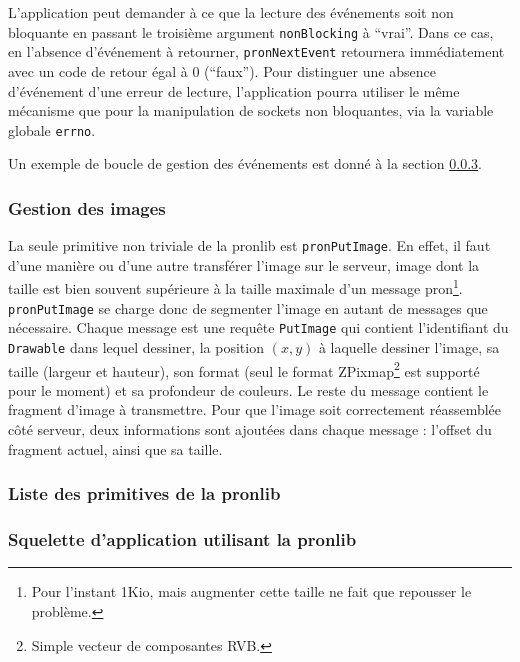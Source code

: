L'application peut demander à ce que la lecture des événements soit non bloquante en passant le troisième argument \verb|nonBlocking| à ``vrai''. Dans ce cas, en l'absence d'événement à retourner, \verb|pronNextEvent| retournera immédiatement avec un code de retour égal à 0 (``faux''). Pour distinguer une absence d'événement d'une erreur de lecture, l'application pourra utiliser le même mécanisme que pour la manipulation de sockets non bloquantes, via la variable globale \verb|errno|.

Un exemple de boucle de gestion des événements est donné à la section \ref{Squelette}.

\subsubsection{Gestion des images}
\label{PronlibImages}

La seule primitive non triviale de la pronlib est \verb|pronPutImage|. En effet, il faut d'une manière ou d'une autre transférer l'image sur le serveur, image dont la taille est bien souvent supérieure à la taille maximale d'un message pron\footnote{Pour l'instant 1Kio, mais augmenter cette taille ne fait que repousser le problème.}. \verb|pronPutImage| se charge donc de segmenter l'image en autant de messages que nécessaire. Chaque message est une requête \verb|PutImage| qui contient l'identifiant du \verb|Drawable| dans lequel dessiner, la position $(x, y)$ à laquelle dessiner l'image, sa taille (largeur et hauteur), son format (seul le format ZPixmap\footnote{Simple vecteur de composantes RVB.} est supporté pour le moment) et sa profondeur de couleurs. Le reste du message contient le fragment d'image à transmettre. Pour que l'image soit correctement réassemblée côté serveur, deux informations sont ajoutées dans chaque message : l'offset du fragment actuel, ainsi que sa taille.

\subsubsection{Liste des primitives de la pronlib}



\subsubsection{Squelette d'application utilisant la pronlib}
\label{Squelette}


